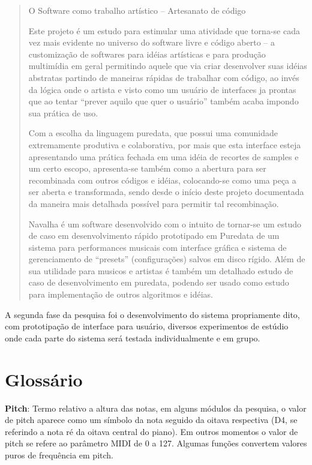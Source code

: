 \documentclass{ppgmus}
\begin{document}
\begin{quotation}

O Software como trabalho artístico – Artesanato de código 

Este projeto é um estudo para estimular uma atividade que torna-se cada vez mais evidente no universo 
do software livre e código aberto – a customização de softwares para idéias artísticas e para produção 
multimídia em geral permitindo aquele que via criar desenvolver suas idéias abstratas partindo de maneiras 
rápidas de trabalhar com código, ao invés da lógica onde o artista e visto como um usuário de interfaces ja 
prontas que ao tentar “prever aquilo que quer o usuário” também acaba impondo sua prática de uso.

Com a escolha da linguagem puredata, que possui uma comunidade extremamente produtiva e colaborativa,  
por mais que esta interface esteja apresentando uma prática fechada em uma idéia de recortes de samples e um 
certo escopo, apresenta-se também como a abertura para ser recombinada com outros códigos e idéias, colocando-se 
como uma peça a ser aberta e transformada, sendo desde o início deste projeto documentada da maneira mais detalhada 
possível para permitir tal recombinação.

Navalha é um software desenvolvido com o intuito de tornar-se um estudo de caso em desenvolvimento rápido prototipado 
em Puredata de um sistema para performances musicais com interface gráfica e sistema de gerenciamento de “presets” 
(configurações) salvos em disco rígido. Além de sua utilidade para musicos e artistas é também um detalhado estudo 
de caso de desenvolvimento em puredata, podendo ser usado como estudo para implementação de outros algoritmos e idéias.
\end{quotation} 


A segunda fase da pesquisa foi o desenvolvimento do
sistema propriamente dito, com prototipação de interface para usuário,
diversos experimentos de estúdio onde cada parte do sistema será
testada individualmente e em grupo.




\section{Glossário}
\label{glossario}


\textbf{Pitch}: Termo relativo a altura das notas, em alguns módulos da pesquisa,
o valor de pitch aparece como um símbolo da nota seguido da oitava respectiva (D4, se
referindo a nota ré da oitava central do piano). Em outros momentos o valor de pitch
se refere ao parâmetro MIDI de 0 a 127. Algumas funções convertem valores puros de frequência
em pitch.
\end{document}
